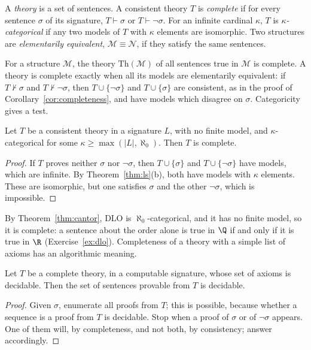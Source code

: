 \begin{definition}\label{def:complete}
A \emph{theory} is a set of sentences. A consistent theory $T$ is \emph{complete} if for every sentence $\sigma$ of its signature, $T\vdash\sigma$ or $T\vdash\neg\sigma$. For an infinite cardinal $\kappa$, $T$ is \emph{$\kappa$-categorical} if any two models of $T$ with $\kappa$ elements are isomorphic. Two structures are \emph{elementarily equivalent}, $\mathcal M\equiv\mathcal N$, if they satisfy the same sentences.
\end{definition}

For a structure $\mathcal M$, the theory $\mathrm{Th}(\mathcal M)$ of all sentences true in $\mathcal M$ is complete. A theory is complete exactly when all its models are elementarily equivalent: if $T\nvdash\sigma$ and $T\nvdash\neg\sigma$, then $T\cup\{\neg\sigma\}$ and $T\cup\{\sigma\}$ are consistent, as in the proof of Corollary~\ref{cor:completeness}, and have models which disagree on $\sigma$. Categoricity gives a test.

\begin{theorem}\label{thm:losvaught}
Let $T$ be a consistent theory in a signature $L$, with no finite model, and $\kappa$-categorical for some $\kappa\ge\max(|L|,\aleph_0)$. Then $T$ is complete.
\end{theorem}

\begin{proof}
If $T$ proves neither $\sigma$ nor $\neg\sigma$, then $T\cup\{\sigma\}$ and $T\cup\{\neg\sigma\}$ have models, which are infinite. By Theorem~\ref{thm:ls}(b), both have models with $\kappa$ elements. These are isomorphic, but one satisfies $\sigma$ and the other $\neg\sigma$, which is impossible.
\end{proof}

By Theorem~\ref{thm:cantor}, $\mathrm{DLO}$ is $\aleph_0$-categorical, and it has no finite model, so it is complete: a sentence about the order alone is true in $\Q$ if and only if it is true in $\R$ (Exercise~\ref{ex:dlo}). Completeness of a theory with a simple list of axioms has an algorithmic meaning.

\begin{proposition}\label{prop:completedecidable}
Let $T$ be a complete theory, in a computable signature, whose set of axioms is decidable. Then the set of sentences provable from $T$ is decidable.
\end{proposition}

\begin{proof}
Given $\sigma$, enumerate all proofs from $T$; this is possible, because whether a sequence is a proof from $T$ is decidable. Stop when a proof of $\sigma$ or of $\neg\sigma$ appears. One of them will, by completeness, and not both, by consistency; answer accordingly.
\end{proof}


